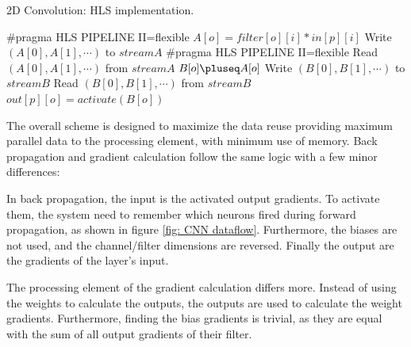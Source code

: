 \begin{algorithm}[H]
    \caption[Conv2d HLS implementation.]{2D Convolution: HLS implementation.}
    \label{alg:Conv2d HLS}
    \begin{algorithmic}
        \EndFunction
                    \State \#pragma HLS PIPELINE II=flexible
                     
                        \State $A[o] = filter[o][i] * in[p][i]$
                    \EndFor
                    \State Write $(A[0], A[1], \cdots)$ to $streamA$
                \EndFor
            \EndFor
        \EndFunction
                    \State \#pragma HLS PIPELINE II=flexible
                    \State Read $(A[0], A[1], \cdots)$ from $streamA$
                     
                        \State $B[o] \pluseq A[o]$
                    \EndFor
                \EndFor
                \State Write $(B[0], B[1], \cdots)$ to $streamB$
            \EndFor
        \EndFunction
                \State Read $(B[0], B[1], \cdots)$ from $streamB$
                    \State $out[p][o] = activate(B[o])$
                \EndFor
            \EndFor
        \EndFunction
    \end{algorithmic}
\end{algorithm}

The overall scheme is designed to maximize the data reuse providing maximum parallel data to the processing element, with minimum use of memory. Back propagation and gradient calculation follow the same logic with a few minor differences:

In back propagation, the input is the activated output gradients. To activate them, the system need to remember which neurons fired during forward propagation, as shown in figure \ref{fig: CNN dataflow}. Furthermore, the biases are not used, and the channel/filter dimensions are reversed. Finally the output are the gradients of the layer's input.

The processing element of the gradient calculation differs more. Instead of using the weights to calculate the outputs, the outputs are used to calculate the weight gradients. Furthermore, finding the bias gradients is trivial, as they are equal with the sum of all output gradients of their filter.

